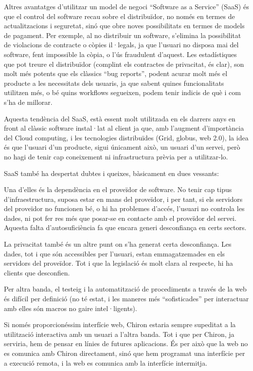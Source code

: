 Altres avantatges d'utilitzar un model de negoci ``Software as a Service''
(SaaS) és que el control del software recau sobre el distribuïdor, no només en
termes de actualitzacions i seguretat, sinó que obre noves possibilitats en
termes de models de pagament.   Per exemple, al no distribuir un software,
s'elimina la possibilitat de violacions de contracte o còpies il·legals, ja que
l'usuari no disposa mai del software, fent impossible la còpia, o l'ús
fraudulent d'aquest.  Les estadístiques que pot treure el distribuïdor (complint
els contractes de privacitat, és clar), son molt més potents que els clàssics
``bug reports'', podent acurar molt més el producte a les necessitats dels
usuaris, ja que sabent quines funcionalitats utilitzen més, o bé quins workflows
segueixen, podem tenir indicis de què i com s'ha de millorar.

Aquesta tendència del SaaS, està essent molt utilitzada en els darrers anys en
front al clàssic software instal·lat al client ja que, amb l'augment d'importància
del Cloud computing, i les tecnologies distribuïdes (Grid, globus, web 2.0), la
idea és que l'usuari d'un producte, sigui únicament això, un usuari d'un servei,
però no hagi de tenir cap coneixement ni infrastructura prèvia per a
utilitzar-lo.

SaaS també ha despertat dubtes i queixes, bàsicament en dues vessants:

Una d'elles és la dependència en el proveïdor de software.  No tenir cap tipus
d'infraestructura, suposa estar en mans del proveïdor, i per tant, si els
servidors del proveïdor no funcionen bé, o hi ha problemes d'accés, l'usuari
no controla les dades, ni pot fer res més que posar-se en contacte amb el
proveïdor del servei.  Aquesta falta d'autosuficiència fa que encara generi
desconfiança en certs sectors.

La privacitat també és un altre punt on s'ha generat certa desconfiança.  Les
dades, tot i que són accessibles per l'usuari, estan emmagatzemades en els
servidors del proveïdor.  Tot i que la legislació és molt clara al respecte,
hi ha clients que desconfien.

Per altra banda, el testeig i la automatització de procediments a través de la
web és difícil per definició (no té estat, i les maneres més ``sofisticades''
per interactuar amb elles són macros no gaire intel·ligents).

Si només proporcionéssim interfície web, Chiron estaria sempre supeditat a la
utilització interactiva amb un usuari a l'altra banda.  Tot i que per Chiron, ja
serviria, hem de pensar en línies de futures aplicacions.  És per això que la
web no es comunica amb Chiron directament, sinó que hem programat una interfície
per a execució remota, i la web es comunica amb la interfície intermitja.

